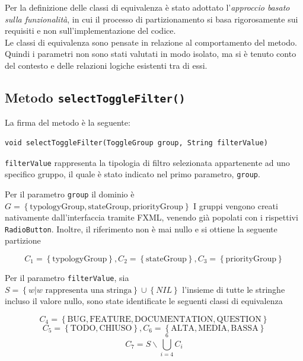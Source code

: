 \noindent Per la definizione delle classi di equivalenza è stato adottato l'\textit{approccio basato sulla funzionalità}, 
in cui il processo di partizionamento si basa rigorosamente sui requisiti
e non sull'implementazione del codice. \\
\indent Le classi di equivalenza sono pensate in relazione al
comportamento del metodo. Quindi i parametri non sono stati valutati in modo isolato, ma si
è tenuto conto del contesto e delle relazioni logiche esistenti tra di essi.

\subsection{Metodo \texttt{selectToggleFilter()}}

\noindent La firma del metodo è la seguente:

\begin{minipage}{\linewidth}
\centering\begin{verbatim}
void selectToggleFilter(ToggleGroup group, String filterValue)
\end{verbatim}
\end{minipage}

\noindent\texttt{filterValue} rappresenta la tipologia di filtro selezionata appartenente ad uno specifico
gruppo, il quale è stato indicato nel primo parametro, \texttt{group}.

Per il parametro \texttt{group} il dominio è 
$G = \left\{ \text{typologyGroup}, \text{stateGroup},\text{priorityGroup}\right\}$ 
I gruppi vengono creati nativamente dall'interfaccia tramite FXML, venendo 
già popolati con i rispettivi \texttt{RadioButton}. Inoltre, il riferimento
non è mai nullo e si ottiene la seguente partizione

\noindent$$C_{1} =\left\{\text{typologyGroup}\right\},
C_{2} =\left\{\text{stateGroup}\right\},
C_{3} =\left\{\text{priorityGroup}\right\}$$

\noindent Per il parametro \texttt{filterValue}, sia $S = \left\{ w|w \text{ rappresenta una stringa} \right\}\cup \left\{ \textit{NIL} \right\}$  
l'insieme di tutte le stringhe incluso il valore nullo, sono state identificate
le seguenti classi di equivalenza

\noindent$$C_{4} =\left\{\text{BUG},\text{FEATURE},\text{DOCUMENTATION},\text{QUESTION}\right\}$$
$$C_{5} =\left\{\text{TODO},\text{CHIUSO}\right\},C_{6} =\left\{\text{ALTA},\text{MEDIA},\text{BASSA}\right\}$$
$$C_{7} = S\smallsetminus \bigcup_{i=4}^{6}C_{i}$$

